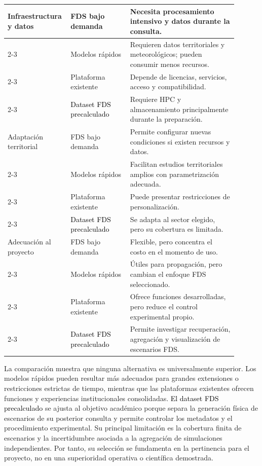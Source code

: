 \begin{longtable}{@{}p{0.20\linewidth}p{0.25\linewidth}p{0.45\linewidth}@{}}
Infraestructura y datos &
FDS bajo demanda &
Necesita procesamiento intensivo y datos durante la consulta. \\
\cline{2-3}
&
Modelos rápidos &
Requieren datos territoriales y meteorológicos; pueden consumir menos recursos. \\
\cline{2-3}
&
Plataforma existente &
Depende de licencias, servicios, acceso y compatibilidad. \\
\cline{2-3}
&
\textcolor{black}{Dataset FDS precalculado} &
Requiere HPC y almacenamiento principalmente durante la preparación. \\
\hline

Adaptación territorial &
FDS bajo demanda &
Permite configurar nuevas condiciones si existen recursos y datos. \\
\cline{2-3}
&
Modelos rápidos &
Facilitan estudios territoriales amplios con parametrización adecuada. \\
\cline{2-3}
&
Plataforma existente &
Puede presentar restricciones de personalización. \\
\cline{2-3}
&
\textcolor{black}{Dataset FDS precalculado} &
Se adapta al sector elegido, pero su cobertura es limitada. \\
\hline

Adecuación al proyecto &
FDS bajo demanda &
Flexible, pero concentra el costo en el momento de uso. \\
\cline{2-3}
&
Modelos rápidos &
Útiles para propagación, pero cambian el enfoque FDS seleccionado. \\
\cline{2-3}
&
Plataforma existente &
Ofrece funciones desarrolladas, pero reduce el control experimental propio. \\
\cline{2-3}
&
\textcolor{black}{Dataset FDS precalculado} &
Permite investigar recuperación, agregación y visualización de escenarios FDS. \\
\hline

\end{longtable}
\endgroup

La comparación muestra que ninguna alternativa es universalmente superior. Los modelos rápidos pueden resultar más adecuados para grandes extensiones o restricciones estrictas de tiempo, mientras que las plataformas existentes ofrecen funciones y experiencias institucionales consolidadas. \textcolor{black}{El dataset FDS precalculado} se ajusta al objetivo académico porque separa la generación física de escenarios de su posterior consulta y permite controlar los metadatos y el procedimiento experimental. Su principal limitación es la cobertura finita de escenarios y la incertidumbre asociada a la agregación de simulaciones independientes. Por tanto, su selección se fundamenta en la pertinencia para el proyecto, no en una superioridad operativa o científica demostrada.


